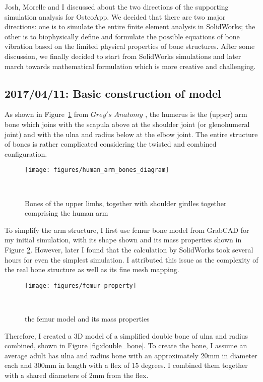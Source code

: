 \documentclass{sigchi}
\begin{document}
Josh, Morelle and I discussed about the two directions of the supporting simulation analysis for OsteoApp. We decided that there are two major directions: one is to simulate the entire finite element analysis in SolidWorks; the other is to biophysically define and formulate the possible equations of bone vibration based on the limited physical properties of bone structures. 
After some discussion, we finally decided to start from SolidWorks simulations and later march towards mathematical formulation which is more creative and challenging.

\subsection{2017/04/11: Basic construction of model}

As shown in Figure~\ref{fig:arm_diagram} from $Grey's$ $Anatomy$ \cite{WikipediaEN:Arm}, the humerus is the (upper) arm bone which joins with the scapula above at the shoulder joint (or glenohumeral joint) and with the ulna and radius below at the elbow joint. The entire structure of bones is rather complicated considering the twisted and combined configuration.


\begin{figure}
\centering
  \texttt{[image: figures/human\_arm\_bones\_diagram]}
  \caption{Bones of the upper limbs, together with shoulder girdles together comprising the human arm}~\label{fig:arm_diagram}
\end{figure}


To simplify the arm structure, I first use femur bone model from GrabCAD \cite{SB:bone} for my initial simulation, with its shape shown and its mass properties shown in Figure \ref{fig:femur_property}. However, later I found that the calculation by SolidWorks took several hours for even the simplest simulation. I attributed this issue as the complexity of the real bone structure as well as its fine mesh mapping. 


\begin{figure}
\centering
  \texttt{[image: figures/femur\_property]}
  \caption{the femur model and its mass properties }~\label{fig:femur_property}
\end{figure}


Therefore, I created a 3D model of a simplified double bone of ulna and radius combined, shown in Figure \ref{fig:double_bone}. To create the bone, I assume an average adult has ulna and radius bone with an approximately 20mm in diameter each and 300mm in length with a flex of 15 degrees. I combined them together with a shared diameters of 2mm from the flex. 
\end{document}
